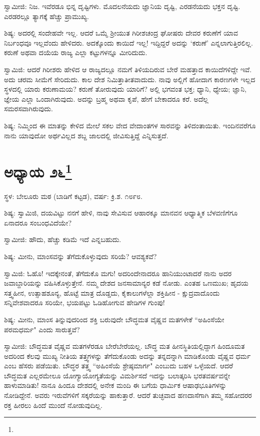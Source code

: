 ಸ್ವಾಮೀಜಿ: ನಿಜ. ಇವೆರಡೂ ಭಿನ್ನ ದೃಷ್ಟಿಗಳು. ಮೊದಲನೆಯದು ಜ್ಞಾನಿಯ ದೃಷ್ಟಿ, ಎರಡನೆಯದು ಭಕ್ತನ ದೃಷ್ಟಿ. ಎರಡರಲ್ಲೂ ತ್ಯಾಗಕ್ಕೆ ಹೆಚ್ಚು ಪ್ರಾಮುಖ್ಯ.

ಶಿಷ್ಯ: ಅದರಲ್ಲಿ ಸಂದೇಹವೇ ಇಲ್ಲ. ಆದರೆ ಒಮ್ಮೆ ಶ‍್ರೀಯುತ ಗಿರೀಶಚಂದ್ರ ಘೋಷರು ದೇವರ ಕರುಣೆಗೆ ಯಾವ ನಿರ್ಬಂಧವೂ ಇಲ್ಲವೆಂದು ಹೇಳಿದರು. ಅದಕ್ಕೊಂದು ಕಾಯಿದೆ ಇಲ್ಲ! ಇದ್ದಿದ್ದರೆ ಅದನ್ನು ‘ಕರುಣೆ’ ಎನ್ನಲಾಗುತ್ತಿರಲಿಲ್ಲ. ಕರುಣೆ ಅಥವಾ ದಯೆಯ ರಾಜ್ಯ ಎಲ್ಲಾ ಕಟ್ಟುಗಳನ್ನೂ ಮೀರಿದುದು.

ಸ್ವಾಮಿಜಿ: ಆದರೆ ಗಿರೀಶರು ಹೇಳಿದ ಆ ರಾಜ್ಯದಲ್ಲೂ ನಮಗೆ ತಿಳಿಯದಿರುವ ಬೇರೆ ಮಹತ್ತಾದ ಕಾಯಿದೆಗಳಿದ್ದೇ ಇವೆ. ಅದು ಚರಮ ಸೀಮೆಗೆ ಸೇರಿದುದು. ಕಾಲ ದೇಶ ನಿಮಿತ್ತಾತೀತವಾದುದು. ನಾವು ಅಲ್ಲಿಗೆ ಹೋದಾಗ ಕಾರಣಗಳೇ ಇಲ್ಲದ ಸ್ಥಳದಲ್ಲಿ ಯಾರು ಕರುಣಾಮಯ? ಕರುಣೆ ತೋರುವುದು ಯಾರಿಗೆ? ಅಲ್ಲಿ ಭಗವಂತ ಭಕ್ತ; ಧ್ಯಾನಿ, ಧ್ಯೇಯ; ಜ್ಞಾನಿ, ಜ್ಞೇಯ ಎಲ್ಲಾ ಒಂದಾಗಿರುವುದು. ಅದನ್ನು ಬ್ರಹ್ಮ ಅಥವಾ ಕೃಪೆ, ಹೇಗೆ ಬೇಕಾದರೂ ಕರೆ. ಅದೆಲ್ಲ ಸಮರಸವಾಗಿರುವುದು.

ಶಿಷ್ಯ: ನಿಮ್ಮಿಂದ ಈ ಮಾತನ್ನು ಕೇಳಿದ ಮೇಲೆ ಸಕಲ ವೇದ ವೇದಾಂತಗಳ ಸಾರವನ್ನು ತಿಳಿದಂತಾಯಿತು. ಇಂದಿನವರೆಗೂ ನಾನು ಯಾವುದೋ ಅರ್ಥವಿಲ್ಲದ ಶಬ್ದ ಜಾಲದಲ್ಲಿ ಜೀವಿಸುತ್ತಿದ್ದೆ ಎನ್ನಿಸುತ್ತದೆ.

\newpage

\chapter[ಅಧ್ಯಾಯ ೨೬]{ಅಧ್ಯಾಯ ೨೬\protect\footnote{}}

\centerline{ಸ್ಥಳ: ಬೇಲೂರು ಮಠ (ಬಾಡಿಗೆ ಕಟ್ಟಡ), ವರ್ಷ: ಕ್ರಿ.ಶ. ೧೮೯೮.}

ಶಿಷ್ಯ: ಸ್ವಾಮಿಜಿ, ದಯವಿಟ್ಟು ನನಗೆ ಹೇಳಿ, ನಾವು ಸೇವಿಸುವ ಆಹಾರಕ್ಕೂ ಮಾನವನ ಆಧ್ಯಾತ್ಮಿಕ ಬೆಳವಣಿಗೆಗೂ ಏನಾದರೂ ಸಂಬಂಧವಿದೆಯೇ?

ಸ್ವಾಮೀಜಿ: ಹೌದು, ಹೆಚ್ಚು ಕಡಿಮೆ ಇದೆ ಎನ್ನಬಹುದು.

ಶಿಷ್ಯ: ಮೀನು, ಮಾಂಸವನ್ನು ತೆಗೆದುಕೊಳ್ಳುವುದು ಸರಿಯೆ? ಆವಶ್ಯಕವೆ?

ಸ್ವಾಮಿಜಿ: ಓಹೊ! ಇದಕ್ಕೇನಂತೆ, ತೆಗೆದುಕೊ ಮಗು! ಅದರಿಂದೇನಾದರೂ ಹಾನಿಯುಂಟಾದರೆ ನಾನು ಅದರ ಜವಾಬ್ದಾರಿಯನ್ನು ವಹಿಸಿಕೊಳ್ಳುತ್ತೇನೆ. ನಮ್ಮ ದೇಶದ ಜನಸಾಮಾನ್ಯರ ಕಡೆ ನೋಡು. ಎಂತಹ ಒಣಮುಖ; ಹೃದಯ ಸತ್ತ್ವಹೀನ, ಉತ್ಸಾಹಶೂನ್ಯ, ಹೊಟ್ಟೆ ಮಾತ್ರ ದೊಡ್ಡದು, ಕೈಕಾಲುಗಳೆಲ್ಲಾ ಶಕ್ತಿಹೀನ - ಕ್ಷುದ್ರವಾದೊಂದು ಸನ್ನಿವೇಶವಾದರೂ ಸರಿಯೇ, ಭಯಪಟ್ಟು ಓಡಿಹೋಗುವ ಹೇಡಿಗಳ ಗುಂಪು!

ಶಿಷ್ಯ: ಮೀನು, ಮಾಂಸ ತಿನ್ನುವುದರಿಂದ ಶಕ್ತಿ ಬರುವುದೇ ಬೌದ್ಧಮತ ವೈಷ್ಣವ ಮತಗಳೇಕೆ “ಅಹಿಂಸೆಯೇ ಪರಮಧರ್ಮ" ಎಂದು ಸಾರುತ್ತವೆ?

ಸ್ವಾಮೀಜಿ: ಬೌದ್ಧಮತ ವೈಷ್ಣವ ಮತಗಳೆರಡೂ ಬೇರೆಬೇರೆಯಲ್ಲ. ಬೌದ್ಧ ಮತ ಹೀನಸ್ಥಿತಿಯಲ್ಲಿದ್ದಾಗ ಹಿಂದೂಮತ ಅದರಿಂದ ಕೆಲವು ಮುಖ್ಯ ನೀತಿಯ ತತ್ತ್ವಗಳನ್ನು ತೆಗೆದುಕೊಂಡು ಅದನ್ನು ತನ್ನದನ್ನಾಗಿ ಮಾಡಿಕೊಂಡು ವೈಷ್ಣವ ಧರ್ಮ ಎಂಬ ಹೆಸರು ಪಡೆಯಿತು. ಬೌದ್ಧರ ತತ್ತ್ವ “ಅಹಿಂಸೆಯೆ ಶ್ರೇಷ್ಠಮಾರ್ಗ" ಎಂಬುದು ಬಹಳ ಒಳ್ಳೆಯದೆ. ಆದರೆ ಬೌದ್ಧಮತ ಎಲ್ಲರಮೇಲೂ ಯೋಗ್ಯಾಯೋಗ್ಯತೆಯನ್ನು ವಿಮರ್ಶಿಸದೆ ಇದನ್ನು ಬಲಾತ್ಕರಿಸಿ ಭರತವರ್ಷವನ್ನೇ ಹಾಳುಮಾಡಿತು! ನಾನೂ ಹಿಂದೂ ದೇಶದಲ್ಲಿ ಅನೇಕ ಮಂದಿ ಈ ಬಗೆಯ ಧಾರ್ಮಿಕ ಆಷಾಢಭೂತಿಗಳನ್ನು ನೋಡಿದ್ದೇನೆ. ಅವರು ಇರುವೆಗಳಿಗೆ ಸಕ್ಕರೆಯನ್ನು ಹಾಕುತ್ತಾರೆ. ಆದರೆ ತುಚ್ಛವಾದ ಹಣದಾಸೆಗಾಗಿ ತಮ್ಮ ಸಹೋದರರ ರಕ್ತ ಹೀರಲು ಹಿಂದೆ ಮುಂದೆ ನೋಡುವುದಿಲ್ಲ.

